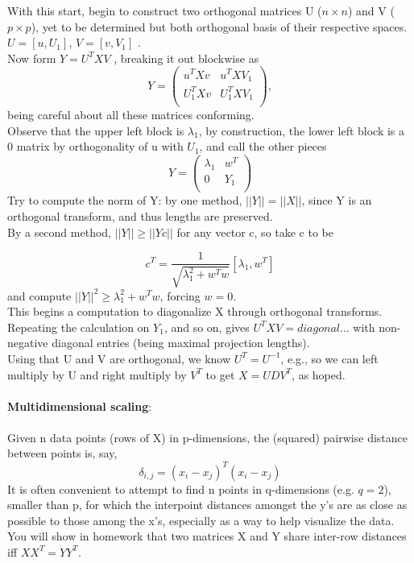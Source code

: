 \documentclass[11pt,a4paper]{article}
\begin{document}
With this start, begin to construct two orthogonal matrices U ($n \times n$) and V ($p \times p$), yet to be determined but both orthogonal basis of their respective spaces. $U = [ u, U_1 ]$,  $V = [ v, V_1 ]$ .\\
Now form $Y = U^T X V$ , breaking it out blockwise as
$$Y=\begin{pmatrix}
       u^T X v & u^T X V_1 \\[0.3em]
       U_1^T X v &  U_1^T X V_1     \\[0.3em]
     \end{pmatrix},$$
being careful about all these matrices conforming.\\
Observe that the upper left block is $\lambda_1$, by construction, the lower left block is a 0 matrix by orthogonality of u with $U_1$, and call the other pieces
$$Y=\begin{pmatrix}
       \lambda_1 & w^T \\[0.3em]
       0 &  Y_1 \\[0.3em]
     \end{pmatrix}$$
Try to compute the norm of Y:  by one method, $||Y|| = || X ||$, since Y is an orthogonal transform, and thus lengths are preserved. \\
By a second method, $||Y|| \geq ||Y c ||$ for any vector c, so take c to be

$$c^T = \frac{1}{\sqrt{ \lambda_1^2 + w^Tw }} [ \lambda_1,   w^T ]$$
and compute $||Y||^2 \geq \lambda_1^2 + w^T w$, forcing $w=0$.\\
This begins a computation to diagonalize X through orthogonal transforms.  Repeating the calculation on $Y_1$, and so on, gives $U^T X V = diagonal...$ with non-negative diagonal entries (being maximal projection lengths).\\
Using that U and V are orthogonal, we know $U^T = U^{-1}$, e.g., so we can left multiply by U and right multiply by $V^T$ to get $X = U D V^T$, as hoped.\\\\
\textbf{Multidimensional scaling}:\\\\
Given n data points (rows of X) in p-dimensions, the (squared) pairwise distance between points is, say,
$$\delta_{i,j}  = (x_i - x_j)^T (x_i - x_j)$$
It is often convenient to attempt to find n points in q-dimensions (e.g. $q=2$), smaller than p, for which the interpoint distances amongst the y's are as close as possible to those among the x's, especially as a way to help visualize the data.\\
You will show in homework that two matrices X and Y share inter-row distances iff  $X X^T = Y Y^T$.
\end{document}
